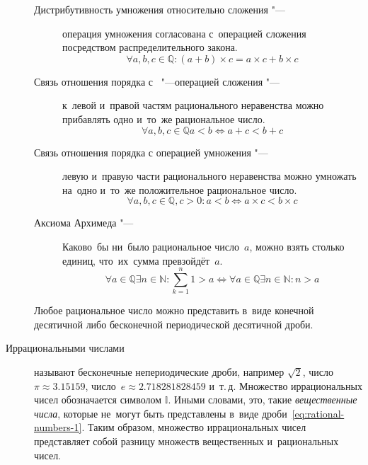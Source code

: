 \documentclass[]{scrartcl}
\begin{document}
\begin{description}
\begin{description}
\begin{equation}
		\end{equation}
		\item[Дистрибутивность умножения относительно сложения "---] операция умножения согласована с~операцией сложения посредством распределительного закона.
		\begin{equation}\label{eq:rational-numbers-distributivity-of-mult-erel-to-sum}
		\forall a,b,c \in \mathbb{Q}: (a+b) \times c = a \times c + b \times c
		\end{equation}
		\item[Связь отношения порядка с~ "---операцией сложения "---] к~левой и~правой частям рационального неравенства можно прибавлять одно и~то~же рациональное число.
		\begin{equation}\label{eq:rational-numbers-relation-of-order-sum}
		\forall a,b,c \in \mathbb{Q} a<b \Leftrightarrow  a + c < b +c
		\end{equation}
		\item[Связь отношения порядка с операцией умножения "---] левую и~правую части рационального неравенства можно умножать на~одно и~то~же положительное рациональное число.
		\begin{equation}\label{eq:rational-numbers-relation-of-order-mult}
		\forall a,b,c \in \mathbb{Q}, c>0: a<b \Leftrightarrow  a \times c < b \times c
		\end{equation}
		\item[Аксиома Архимеда "---] Каково~бы ни~было рациональное число~${\textstyle a}$, можно взять столько единиц, что~их~сумма превзойдёт~${\textstyle a}$.
		\begin{equation}\label{eq:rational-numbers-archimed-axiom}
		\forall a \in \mathbb{Q} \exists n \in \mathbb{N}:\sum_{k=1}^{n}1 > a \Leftrightarrow \forall a \in \mathbb{Q} \exists n \in \mathbb{N}: n >a
		\end{equation}
	\end{description}
	Любое рациональное число можно представить в~виде конечной десятичной либо бесконечной периодической десятичной дроби.
	\item[Иррациональными числами] называют бесконечные непериодические дроби, например $\sqrt{2}$, число $\pi \approx 3.15159$, число~$e \approx 2.718281828459$ и~т.\,д. Множество иррациональных чисел обозначается символом $\mathbb{I}$. Иными словами, это, такие \emph{вещественные числа}, которые не~могут быть представлены в~виде дроби~\ref{eq:rational-numbers-1}. Таким образом, множество иррациональных чисел представляет собой разницу множеств вещественных и~рациональных чисел.
	\begin{equation}\label{eq:irrational-numbers}

\end{equation}
\end{description}
\end{document}
